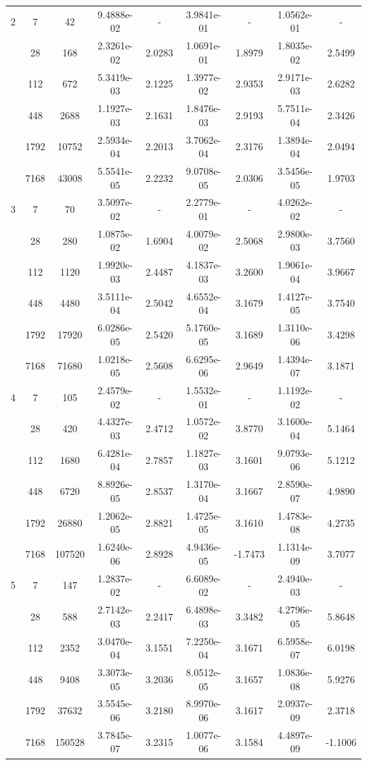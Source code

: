 \begin{longtable}{| c | c c | c c | c c | c c |}
	\hline

	2	& 7 & 42 & 9.4888e-02 & - & 3.9841e-01 & - & 1.0562e-01 & - \\
		& 28 & 168 & 2.3261e-02 & 2.0283 & 1.0691e-01 & 1.8979 & 1.8035e-02 & 2.5499 \\
		& 112 & 672 & 5.3419e-03 & 2.1225 & 1.3977e-02 & 2.9353 & 2.9171e-03 & 2.6282 \\
		& 448 & 2688 & 1.1927e-03 & 2.1631 & 1.8476e-03 & 2.9193 & 5.7511e-04 & 2.3426 \\
		& 1792 & 10752 & 2.5934e-04 & 2.2013 & 3.7062e-04 & 2.3176 & 1.3894e-04 & 2.0494 \\
		& 7168 & 43008 & 5.5541e-05 & 2.2232 & 9.0708e-05 & 2.0306 & 3.5456e-05 & 1.9703 \\

	\hline

	3	& 7 & 70 & 3.5097e-02 & - & 2.2779e-01 & - & 4.0262e-02 & - \\
		& 28 & 280 & 1.0875e-02 & 1.6904 & 4.0079e-02 & 2.5068 & 2.9800e-03 & 3.7560 \\
		& 112 & 1120 & 1.9920e-03 & 2.4487 & 4.1837e-03 & 3.2600 & 1.9061e-04 & 3.9667 \\
		& 448 & 4480 & 3.5111e-04 & 2.5042 & 4.6552e-04 & 3.1679 & 1.4127e-05 & 3.7540 \\
		& 1792 & 17920 & 6.0286e-05 & 2.5420 & 5.1760e-05 & 3.1689 & 1.3110e-06 & 3.4298 \\
		& 7168 & 71680 & 1.0218e-05 & 2.5608 & 6.6295e-06 & 2.9649 & 1.4394e-07 & 3.1871 \\

	\hline

	4	& 7 & 105 & 2.4579e-02 & - & 1.5532e-01 & - & 1.1192e-02 & - \\
		& 28 & 420 & 4.4327e-03 & 2.4712 & 1.0572e-02 & 3.8770 & 3.1600e-04 & 5.1464 \\
		& 112 & 1680 & 6.4281e-04 & 2.7857 & 1.1827e-03 & 3.1601 & 9.0793e-06 & 5.1212 \\
		& 448 & 6720 & 8.8926e-05 & 2.8537 & 1.3170e-04 & 3.1667 & 2.8590e-07 & 4.9890 \\
		& 1792 & 26880 & 1.2062e-05 & 2.8821 & 1.4725e-05 & 3.1610 & 1.4783e-08 & 4.2735 \\
		& 7168 & 107520 & 1.6240e-06 & 2.8928 & 4.9436e-05 & -1.7473 & 1.1314e-09 & 3.7077 \\

	\hline

	5	& 7 & 147 & 1.2837e-02 & - & 6.6089e-02 & - & 2.4940e-03 & - \\
		& 28 & 588 & 2.7142e-03 & 2.2417 & 6.4898e-03 & 3.3482 & 4.2796e-05 & 5.8648 \\
		& 112 & 2352 & 3.0470e-04 & 3.1551 & 7.2250e-04 & 3.1671 & 6.5958e-07 & 6.0198 \\
		& 448 & 9408 & 3.3073e-05 & 3.2036 & 8.0512e-05 & 3.1657 & 1.0836e-08 & 5.9276 \\
		& 1792 & 37632 & 3.5545e-06 & 3.2180 & 8.9970e-06 & 3.1617 & 2.0937e-09 & 2.3718 \\
		& 7168 & 150528 & 3.7845e-07 & 3.2315 & 1.0077e-06 & 3.1584 & 4.4897e-09 & -1.1006 \\
	

\end{longtable}
